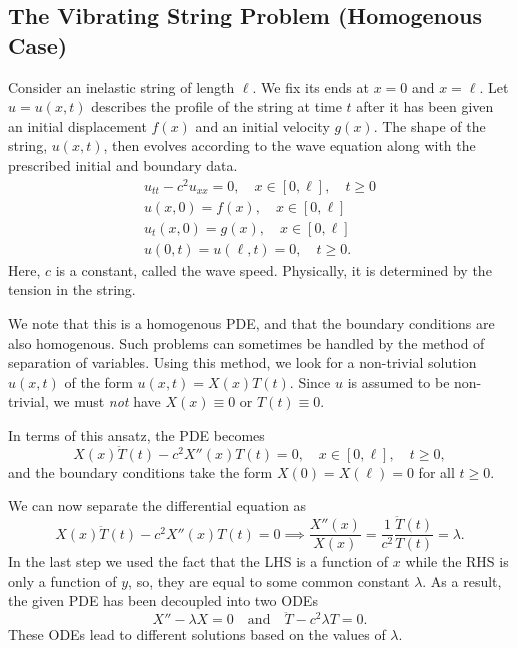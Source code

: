 \documentclass[11pt]{penrose}
\newcommand{\utt}{u_{tt}}
\newcommand{\uxx}{u_{xx}}
\begin{document}
\subsection{The Vibrating String Problem (Homogenous Case)}
Consider an inelastic string of length $\ell$. We fix its ends at $x = 0$ and $x = \ell$. Let $u = u(x,t)$ describes the profile of the string at time $t$ after it has been given an initial displacement $f(x)$ and an initial velocity $g(x)$. The shape of the string, $u(x,t)$, then evolves according to the wave equation along with the prescribed initial and boundary data.
\begin{equation}
\begin{gathered}
    \utt - c^2 \uxx = 0, \quad x \in [0, \ell], \quad t \geq 0\\
    u(x,0) = f(x), \quad x \in [0, \ell]\\
    u_t(x,0) = g(x), \quad x \in [0, \ell]\\
    u(0,t) = u(\ell,t) = 0, \quad t \geq 0.
\end{gathered}
\label{eq:vibrating-string-problem-h}
\end{equation}
Here, $c$ is a constant, called the wave speed. Physically, it is determined by the tension in the string.

We note that this is a homogenous PDE, and that the boundary conditions are also homogenous. Such problems can sometimes be handled by the method of separation of variables. Using this method, we look for a non-trivial solution $u(x,t)$ of the form $u(x,t) = X(x) T(t)$. Since $u$ is assumed to be non-trivial, we must \emph{not} have $X(x) \equiv 0$ or $T(t) \equiv 0$.

In terms of this ansatz, the PDE becomes
\begin{equation}
    X(x) \ddot{T}(t) - c^2 X''(x) T(t) = 0, \quad x \in [0, \ell], \quad t \geq 0,
\end{equation}
and the boundary conditions take the form $X(0) = X(\ell) = 0$ for all $t \geq 0$.

We can now separate the differential equation as
\begin{equation}
    X(x) \ddot{T}(t) - c^2 X''(x) T(t) = 0
    \implies
    \frac{X''(x)}{X(x)} = \frac{1}{c^2} \frac{\ddot{T}(t)}{T(t)} = \lambda.
\end{equation}
In the last step we used the fact that the LHS is a function of $x$ while the RHS is only a function of $y$, so, they are equal to some common constant $\lambda$. As a result, the given PDE has been decoupled into two ODEs
\begin{equation}
    X'' - \lambda X = 0
    \quad\text{and}\quad
    \ddot{T} - c^2 \lambda T = 0.
\end{equation}
These ODEs lead to different solutions based on the values of $\lambda$.
\end{document}
